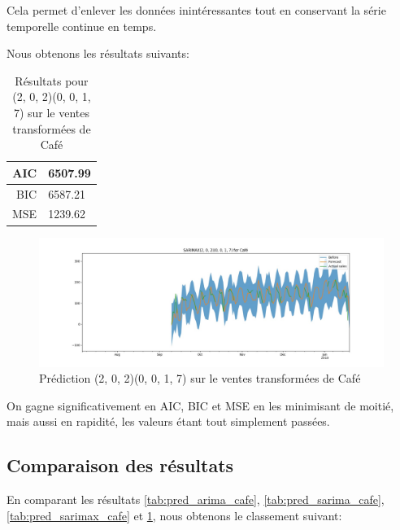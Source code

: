 Cela permet d'enlever les données inintéressantes tout en conservant la série temporelle continue en temps.

Nous obtenons les résultats suivants:
\begin{table}[ht]
    \centering
    \begin{tabular}{r|l}
        AIC & 6507.99 \\
        \hline
        BIC & 6587.21 \\
        \hline
        MSE & 1239.62 \\
    \end{tabular}
    \caption{Résultats pour \SARIMAX(2, 0, 2)(0, 0, 1, 7) sur le ventes transformées de Café}
    \label{tab:pred_sarimax_cafe_remapped}
\end{table}

\begin{figure}[ht]
    \centering
    \includegraphics[width=\textwidth]{figures/pred_sarimax_cafe_remapped.jpg}
    \caption{Prédiction \SARIMAX(2, 0, 2)(0, 0, 1, 7) sur le ventes transformées de Café}
    \label{fig:pred_sarimax_cafe_remapped}
\end{figure}

On gagne significativement en AIC, BIC et MSE en les minimisant de moitié, mais aussi en rapidité, les valeurs  étant tout simplement passées.


\subsection{Comparaison des résultats}
\label{subsec:results_comparison}

En comparant les résultats \ref{tab:pred_arima_cafe}, \ref{tab:pred_sarima_cafe}, \ref{tab:pred_sarimax_cafe} et \ref{tab:pred_sarimax_cafe_remapped}, nous obtenons le classement suivant:

